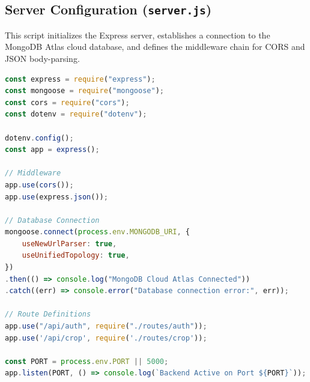 \documentclass[12pt,a4paper]{report}
\begin{document}
\subsection{Server Configuration (\texttt{server.js})}
This script initializes the Express server, establishes a connection to the MongoDB Atlas cloud database, and defines the middleware chain for CORS and JSON body-parsing.
\begin{lstlisting}[language=JavaScript, caption=Server.js Core Configuration]
const express = require("express");
const mongoose = require("mongoose");
const cors = require("cors");
const dotenv = require("dotenv");

dotenv.config();
const app = express();

// Middleware
app.use(cors());
app.use(express.json());

// Database Connection
mongoose.connect(process.env.MONGODB_URI, {
    useNewUrlParser: true,
    useUnifiedTopology: true,
})
.then(() => console.log("MongoDB Cloud Atlas Connected"))
.catch((err) => console.error("Database connection error:", err));

// Route Definitions
app.use("/api/auth", require("./routes/auth"));
app.use('/api/crop', require('./routes/crop'));

const PORT = process.env.PORT || 5000;
app.listen(PORT, () => console.log(`Backend Active on Port ${PORT}`));
\end{lstlisting}
\end{document}
